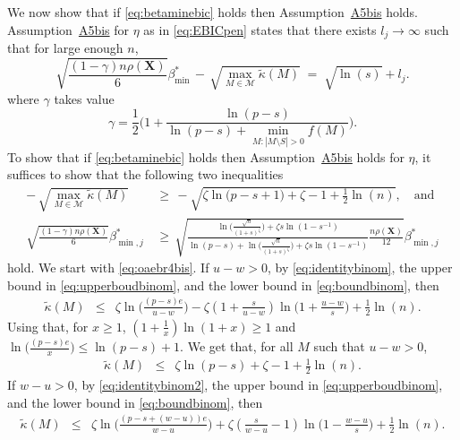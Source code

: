 \documentclass[
  12pt]{article}
\newcommand{\M}{\mathcal{M}}
\newcommand{\bX}{\mathbf{X}}
\begin{document}
We now show that if \eqref{eq:betaminebic} holds then Assumption~\hyperlink{lab:A5bis}{A5bis} holds.
Assumption~\hyperlink{lab:A5bis}{A5bis} for $\eta$ as in \eqref{eq:EBICpen} states that there exists $l_j\to \infty$ such that for large enough $n$,
    \begin{equation*}
        \sqrt{\frac{(1-\gamma) n\rho(\bX)}{6}}{{\beta_{\min}^*}} \,- \,\sqrt{\max_{M\in\M}\tilde{\kappa}(M)} \;=\; \sqrt{\ln(s)} + l_j .
    \end{equation*}
where $\gamma$ takes value
\begin{equation}\label{eq:gammaebic}
    \gamma=\frac12\Big(1+\frac{\ln(p-s)}{\ln(p-s)+\min_{M: |M\setminus S|>0}f(M)}\Big).
\end{equation}
To show that if \eqref{eq:betaminebic} holds then Assumption~\hyperlink{lab:A5bis}{A5bis} holds for $\eta$, it suffices to show that the following two inequalities
\begin{align}
    - \,\sqrt{\max_{M\in\M}\tilde{\kappa}(M)} \,&\geq \,-\sqrt{\zeta\ln\big(p-s+1\big)+\zeta-1+\frac{1}{2}\ln(n)}\label{eq:oaebr4bis},\quad\text{and} \\
    \sqrt{\frac{ (1-\gamma)n\rho(\bX)}{6}}{\beta_{\min,j}^*} \,&\geq \,  \sqrt{\frac{ \ln \big(\tfrac{\sqrt{n}}{(1+s)^{\zeta}}\big)+\zeta s\ln(1-s^{-1})}{\ln(p-s)+ \ln \big(\tfrac{\sqrt{n}}{(1+s)^{\zeta}}\big)+\zeta s\ln(1-s^{-1})}\frac{ n\rho(\bX)}{12}}{\beta_{\min,j}^*} \label{eq:oaebr3bis}
\end{align}
hold. We start with \eqref{eq:oaebr4bis}. If $u-w>0$, by \eqref{eq:identitybinom}, the upper bound in \eqref{eq:upperboudbinom}, and the lower bound in \eqref{eq:boundbinom}, then
 \begin{eqnarray*}
     \tilde{\kappa}(M) &\leq& \zeta\ln\Big(\frac{(p-s)e}{u-w}\Big)-\zeta(1+\frac{s}{u-w})\ln\Big(1+\frac{u-w}{s}\Big)+\frac{1}{2}\ln(n).
 \end{eqnarray*}
 Using that, for $x\geq1$, $(1+\frac{1}{x})\ln(1+x)\geq 1$ and $\ln\big(\frac{(p-s)e}{x}\big)\leq \ln(p-s)+1$. We get that, for all $M$ such that $u-w>0$, 
  \begin{eqnarray}\label{eq:pifr} 
     \tilde{\kappa}(M) &\leq& \zeta\ln(p-s)+\zeta-1+\frac{1}{2}\ln(n).
 \end{eqnarray}
If $w-u>0$, by \eqref{eq:identitybinom2}, the upper bound in \eqref{eq:upperboudbinom}, and the lower bound in \eqref{eq:boundbinom}, then
 \begin{eqnarray*}
     \tilde{\kappa}(M) &\leq& 
     \zeta\ln\Big(\frac{(p-s+(w-u))e}{w-u}\Big)+\zeta(\frac{s}{w-u}-1)\ln\Big(1
     -\frac{w-u}{s}\Big)+\frac{1}{2}\ln(n).
 \end{eqnarray*}
\end{document}
